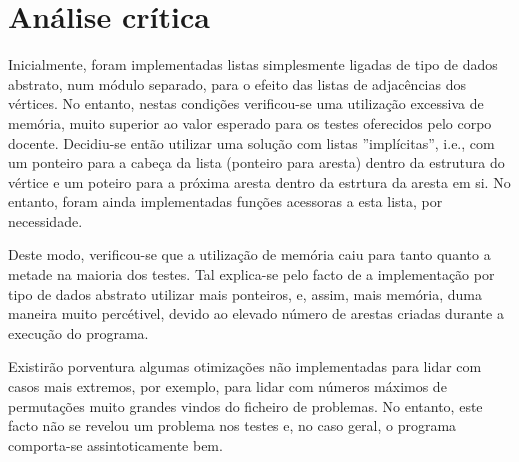 \documentclass[a4paper, 18pt]{article}
\begin{document}
\section{Análise crítica}
\label{sec:analise}
	\par
	Inicialmente, foram implementadas listas simplesmente ligadas de tipo de dados abstrato, num módulo separado, para o efeito das listas de adjacências dos vértices. No entanto, nestas condições verificou-se uma utilização excessiva de memória, muito superior ao valor esperado para os testes oferecidos pelo corpo docente. Decidiu-se então utilizar uma solução com listas ''implícitas'', i.e., com um ponteiro para a cabeça da lista (ponteiro para aresta) dentro da estrutura do vértice e um poteiro para a próxima aresta dentro da estrtura da aresta em si. No entanto, foram ainda implementadas funções acessoras a esta lista, por necessidade.
	\par
	Deste modo, verificou-se que a utilização de memória caiu para tanto quanto a metade na maioria dos testes. Tal explica-se pelo facto de a implementação por tipo de dados abstrato utilizar mais ponteiros, e, assim, mais memória, duma maneira muito percétivel, devido ao elevado número de arestas criadas durante a execução do programa.
	\par\null\par
	Existirão porventura algumas otimizações não implementadas para lidar com casos mais extremos, por exemplo, para lidar com números máximos de permutações muito grandes vindos do ficheiro de problemas. No entanto, este facto não se revelou um problema nos testes e, no caso geral, o programa comporta-se assintoticamente bem.
\end{document}

